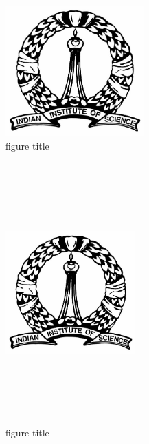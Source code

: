 \documentclass[10pt,a4paper]{article}
\begin{document}
\begin{figure}
\centering
\includegraphics[height=5cm]{IISc_logo.jpg}
\caption{figure title}  %
\label{reference2}        %

\end{figure}

\begin{figure}
\centering
\includegraphics[width=5cm, height=10cm]{IISc_logo.jpg}
\caption{figure title}  %
\label{reference3}        %

\end{figure}
\end{document}
